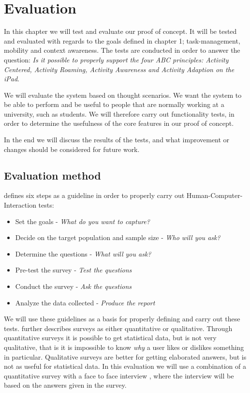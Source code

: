 \chapter{Evaluation}
\label{sec:evaluation}
In this chapter we will test and evaluate our proof of concept. It will be tested and evaluated with regards to the goals defined in chapter 1; task-management, mobility and context awareness. The tests are conducted in order to answer the question: \emph{Is it possible to properly support the four ABC principles: Activity Centered, Activity Roaming, Activity Awareness and Activity Adaption on the iPad}.

We will evaluate the system based on thought scenarios. We want the system to be able to perform and be useful to people that are normally working at a university, such as students. We will therefore carry out functionality tests, in order to determine the usefulness of the core features in our proof of concept.

In the end we will discuss the results of the tests, and what improvement or changes should be considered for future work.

\section{Evaluation method}
\label{sec:evalutationPOC}

\citet{ugur2001} defines six steps as a guideline in order to properly carry out Human-Computer-Interaction tests:

\begin{itemize}
  \item Set the goals - \emph{What do you want to capture?}
  \item Decide on the target population and sample size - \emph{Who will you ask?}
  \item Determine the questions - \emph{What will you ask?}
  \item Pre-test the survey - \emph{Test the questions}
  \item Conduct the survey - \emph{Ask the questions}
  \item Analyze the data collected - \emph{Produce the report}
\end{itemize}

We will use these guidelines as a basis for properly defining and carry out these tests. \citet{ugur2001} further describes surveys as either quantitative or qualitative. Through quantitative surveys it is possible to get statistical data, but is not very qualitative, that is it is impossible to know \emph{why} a user likes or dislikes something in particular. Qualitative surveys are better for getting elaborated answers, but is not as useful for statistical data. In this evaluation we will use a combination of a quantitative survey with a face to face interview \citep{ugur2001}, where the interview will be based on the answers given in the survey. 

